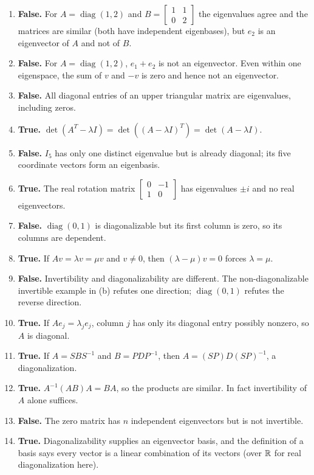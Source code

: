 \begin{enumerate}[label=(\alph*)]
\item \textbf{False.} For $A=\operatorname{diag}(1,2)$ and
$B=\begin{bmatrix}1&1\\0&2\end{bmatrix}$ the eigenvalues agree
and the matrices are similar (both have independent eigenbases),
but $e_2$ is an eigenvector of $A$ and not of $B$.
\item \textbf{False.} For $A=\operatorname{diag}(1,2)$,
$e_1+e_2$ is not an eigenvector. Even within one eigenspace,
the sum of $v$ and $-v$ is zero and hence not an eigenvector.
\item \textbf{False.} All diagonal entries of an upper triangular
matrix are eigenvalues, including zeros.
\item \textbf{True.} $\det(A^T-\lambda I)=
\det((A-\lambda I)^T)=\det(A-\lambda I)$.
\item \textbf{False.} $I_5$ has only one distinct eigenvalue but is
already diagonal; its five coordinate vectors form an eigenbasis.
\item \textbf{True.} The real rotation matrix
$\begin{bmatrix}0&-1\\1&0\end{bmatrix}$ has eigenvalues $\pm i$
and no real eigenvectors.
\item \textbf{False.} $\operatorname{diag}(0,1)$ is diagonalizable
but its first column is zero, so its columns are dependent.
\item \textbf{True.} If $Av=\lambda v=\mu v$ and $v\ne0$,
then $(\lambda-\mu)v=0$ forces $\lambda=\mu$.
\item \textbf{False.} Invertibility and diagonalizability are different.
The non-diagonalizable invertible example in (b) refutes one direction;
$\operatorname{diag}(0,1)$ refutes the reverse direction.
\item \textbf{True.} If $Ae_j=\lambda_je_j$, column $j$ has
only its diagonal entry possibly nonzero, so $A$ is diagonal.
\item \textbf{True.} If $A=SBS^{-1}$ and $B=PDP^{-1}$,
then $A=(SP)D(SP)^{-1}$, a diagonalization.
\item \textbf{True.} $A^{-1}(AB)A=BA$, so the products are
similar. In fact invertibility of $A$ alone suffices.
\item \textbf{False.} The zero matrix has $n$ independent
eigenvectors but is not invertible.
\item \textbf{True.} Diagonalizability supplies an eigenvector basis,
and the definition of a basis says every vector is a linear
combination of its vectors (over $\mathbb{R}$ for real diagonalization here).
\end{enumerate}

